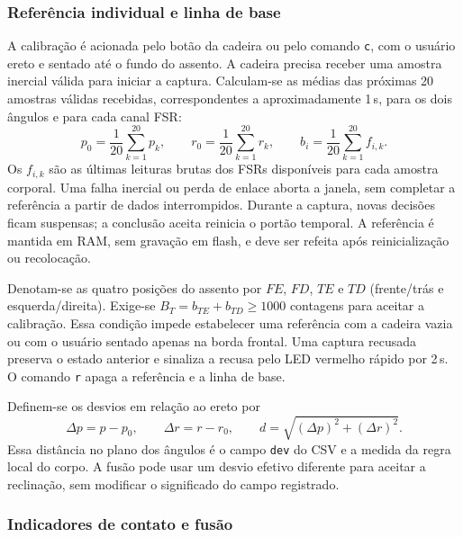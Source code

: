 \subsubsection{Referência individual e linha de base}

A calibração é acionada pelo botão da cadeira ou pelo comando
\texttt{c}, com o usuário ereto e sentado até o fundo do assento. A
cadeira precisa receber uma amostra inercial válida para iniciar a
captura. Calculam-se as médias das próximas 20 amostras válidas
recebidas, correspondentes a aproximadamente 1\,s, para os dois
ângulos e para cada canal FSR:
\begin{equation}
 p_0=\frac{1}{20}\sum_{k=1}^{20}p_k,\qquad
 r_0=\frac{1}{20}\sum_{k=1}^{20}r_k,\qquad
 b_i=\frac{1}{20}\sum_{k=1}^{20}f_{i,k}.
 \label{eq:met-calibracao}
\end{equation}
Os $f_{i,k}$ são as últimas leituras brutas dos FSRs disponíveis para
cada amostra corporal. Uma falha inercial ou perda de enlace aborta a
janela, sem completar a referência a partir de dados interrompidos.
Durante a captura, novas decisões ficam suspensas; a conclusão aceita
reinicia o portão temporal. A referência é mantida em RAM, sem gravação
em flash, e deve ser refeita após reinicialização ou recolocação.

Denotam-se as quatro posições do assento por $FE$, $FD$, $TE$ e $TD$
(frente/trás e esquerda/direita). Exige-se
$B_T=b_{TE}+b_{TD}\geq1000$ contagens para aceitar a calibração. Essa
condição impede estabelecer uma referência com a cadeira vazia ou com
o usuário sentado apenas na borda frontal. Uma captura recusada
preserva o estado anterior e sinaliza a recusa pelo LED vermelho rápido
por 2\,s. O comando \texttt{r} apaga a referência e a linha de base.

Definem-se os desvios em relação ao ereto por
\begin{equation}
 \Delta p=p-p_0,\qquad \Delta r=r-r_0,\qquad
 d=\sqrt{(\Delta p)^2+(\Delta r)^2}.
 \label{eq:met-desvio}
\end{equation}
Essa distância no plano dos ângulos é o campo \texttt{dev} do CSV e a
medida da regra local do corpo. A fusão pode usar um desvio efetivo
diferente para aceitar a reclinação, sem modificar o significado do
campo registrado.

\subsubsection{Indicadores de contato e fusão}

